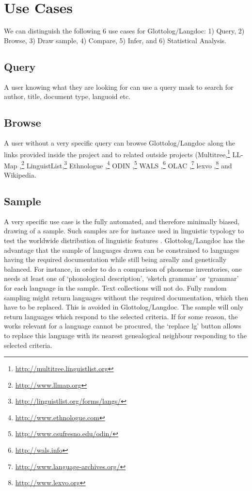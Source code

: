 \documentclass[10pt, a4paper]{article}
\begin{document}
\section{Use Cases}
We can distinguish the following 6 use cases for Glottolog/Langdoc:
1)  Query,
2)  Browse,
3)  Draw sample,
4)  Compare,
5)  Infer, and
6)  Statistical Analysis.

\subsection{Query}
A user knowing what they are looking for can use a query mask to search for author, title, document type, languoid etc. 


\subsection{Browse}
A user without a very specific query can browse Glottolog/Langdoc along the links provided inside the project and to related outside projects (Multitree,\footnote{\url{http://multitree.linguistlist.org}}
 LL-Map \cite{LLMap2009},\footnote{\url{http://www.llmap.org}}
 LinguistList,\footnote{\url{http://linguistlist.org/forms/langs/}}
 Ethnologue \cite{Lewis2009},\footnote{\url{http://www.ethnologue.com}}
 ODIN \cite{Odin2006},\footnote{\url{http://www.csufresno.edu/odin/}}
 WALS \cite{WALS},\footnote{\url{http://wals.info}}
 OLAC \cite{OLAC-Bird},\footnote{\url{http://www.language-archives.org/}}
lexvo \cite{DeMeloEtAl2008lexvo},\footnote{\url{http://www.lexvo.org}} and
Wikipedia.

\subsection{Sample}
A very specific use case is the fully automated, and therefore minimally biased, drawing of a sample. Such samples are for instance used in linguistic typology to test the worldwide distribution of linguistic features \cite{RijkhoffEtAl1998sampling,Bakker2011sampling}. Glottolog/Langdoc has the advantage that the sample of languages drawn can be constrained to languages having the required documentation while still being areally and genetically balanced. For instance, in order to do a comparison of phoneme inventories, one needs at least one of `phonological description', `sketch grammar' or `grammar' for each language in the sample. Text collections will not do. Fully random sampling might return languages without the required documentation, which then have to be replaced. This is avoided in Glottolog/Langdoc. The sample will only return languages which respond to the selected criteria. If for some reason, the works relevant for a language cannot be procured, the `replace lg' button allows to replace this language with its nearest genealogical neighbour responding to the selected criteria.
\end{document}
